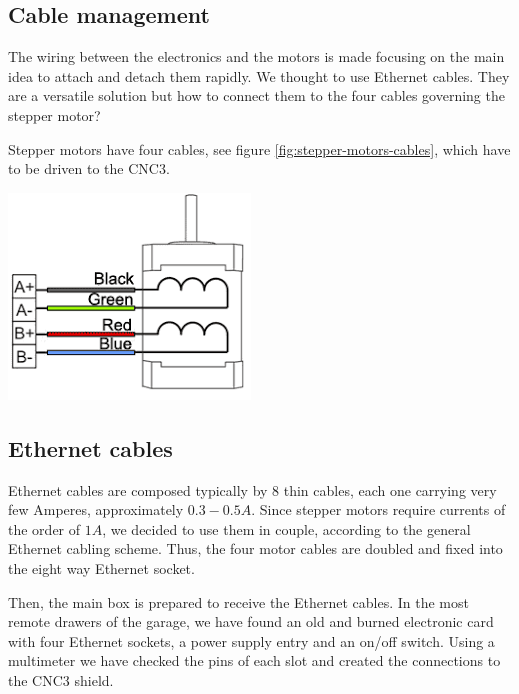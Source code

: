 \documentclass{article}
\begin{document}
\begin{multicols}{2}
        \section{Cable management}
        The wiring between the electronics and the motors is made focusing on the main idea to attach and detach them rapidly.
        We thought to use Ethernet cables.
        They are a versatile solution but how to connect them to the four cables governing the stepper motor?

        Stepper motors have four cables, see figure \ref{fig:stepper-motors-cables}, which have to be driven to the CNC3.
        \\
        \begin{minipage}
            {0.5\textwidth}
            \centering
            \includegraphics[scale=0.5]{stepper-motors-cables.png}
            \label{fig:stepper-motors-cables}
        \end{minipage}

        \subsection{Ethernet cables}
        Ethernet cables are composed typically by 8 thin cables, each one carrying very few Amperes, approximately \(0.3-0.5A\).
        Since stepper motors require currents of the order of \(1A\), we decided to use them in couple, according to the general Ethernet cabling scheme.
        Thus, the four motor cables are doubled and fixed into the eight way Ethernet socket.

        Then, the main box is prepared to receive the Ethernet cables.
        In the most remote drawers of the garage, we have found an old and burned electronic card with four Ethernet sockets, a power supply entry and an on/off switch.
        Using a multimeter we have checked the pins of each slot and created the connections to the CNC3 shield.


\end{multicols}
\end{document}
